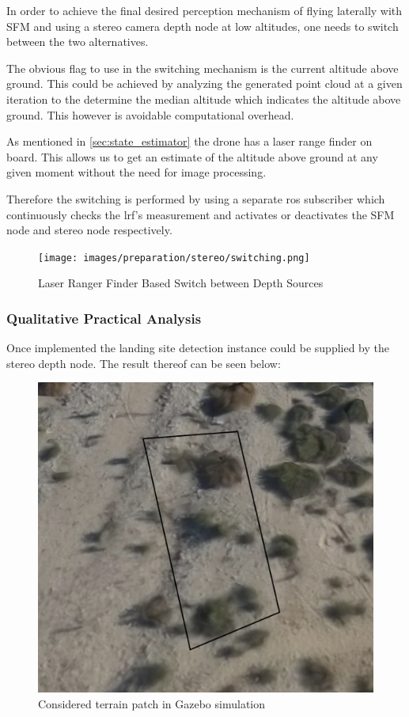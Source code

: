 In order to achieve the final desired perception mechanism of flying laterally with SFM and using a stereo camera depth node at low altitudes, one needs to switch between the two alternatives.

The obvious flag to use in the switching mechanism is the current altitude above ground. This could be achieved by analyzing the generated point cloud at a given iteration to the determine the median altitude which indicates the altitude above ground. This however is avoidable computational overhead.

As mentioned in \cref{sec:state_estimator} the drone has a laser range finder on board. This allows us to get an estimate of the altitude above ground at any given moment without the need for image processing.

Therefore the switching is performed by using a separate ros subscriber which continuously checks the lrf's measurement and activates or deactivates the SFM node and stereo node respectively.

\clearpage %
\begin{figure}
    \centering
    \texttt{[image: images/preparation/stereo/switching.png]}
    \caption{Laser Ranger Finder Based Switch between Depth Sources}
\end{figure}

\subsubsection{Qualitative Practical Analysis}

Once implemented the landing site detection instance could be supplied by the stereo depth node. The result thereof can be seen below:

\begin{figure}[ht!]
    \centering
    \includegraphics[scale=0.2, angle=-12]{images/preparation/reference_map2.5m_annotated.png}
    \caption{Considered terrain patch in Gazebo simulation}
    \label{stereo_reference}
\end{figure}

